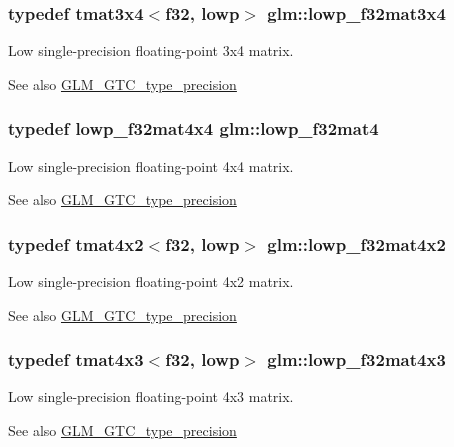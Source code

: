 \subsubsection[{lowp\+\_\+f32mat3x4}]{\setlength{\rightskip}{0pt plus 5cm}typedef tmat3x4$<${\bf f32}, lowp$>$ {\bf glm\+::lowp\+\_\+f32mat3x4}}\label{namespaceglm_a5102fa6a00423f045c058f77d8158bdd}
Low single-\/precision floating-\/point 3x4 matrix. \begin{DoxySeeAlso}{See also}
\hyperlink{group__gtc__type__precision}{G\+L\+M\+\_\+\+G\+T\+C\+\_\+type\+\_\+precision} 
\end{DoxySeeAlso}
\hypertarget{namespaceglm_ada4d11f44b410c1be7b6b1d05ccf692c}{}
\subsubsection[{lowp\+\_\+f32mat4}]{\setlength{\rightskip}{0pt plus 5cm}typedef {\bf lowp\+\_\+f32mat4x4} {\bf glm\+::lowp\+\_\+f32mat4}}\label{namespaceglm_ada4d11f44b410c1be7b6b1d05ccf692c}
Low single-\/precision floating-\/point 4x4 matrix. \begin{DoxySeeAlso}{See also}
\hyperlink{group__gtc__type__precision}{G\+L\+M\+\_\+\+G\+T\+C\+\_\+type\+\_\+precision} 
\end{DoxySeeAlso}
\hypertarget{namespaceglm_aa1fa9f01c5151ed5332a046dc87e4356}{}
\subsubsection[{lowp\+\_\+f32mat4x2}]{\setlength{\rightskip}{0pt plus 5cm}typedef tmat4x2$<${\bf f32}, lowp$>$ {\bf glm\+::lowp\+\_\+f32mat4x2}}\label{namespaceglm_aa1fa9f01c5151ed5332a046dc87e4356}
Low single-\/precision floating-\/point 4x2 matrix. \begin{DoxySeeAlso}{See also}
\hyperlink{group__gtc__type__precision}{G\+L\+M\+\_\+\+G\+T\+C\+\_\+type\+\_\+precision} 
\end{DoxySeeAlso}
\hypertarget{namespaceglm_ac2931d0b3712162304ec7f26ba4db4d4}{}
\subsubsection[{lowp\+\_\+f32mat4x3}]{\setlength{\rightskip}{0pt plus 5cm}typedef tmat4x3$<${\bf f32}, lowp$>$ {\bf glm\+::lowp\+\_\+f32mat4x3}}\label{namespaceglm_ac2931d0b3712162304ec7f26ba4db4d4}
Low single-\/precision floating-\/point 4x3 matrix. \begin{DoxySeeAlso}{See also}
\hyperlink{group__gtc__type__precision}{G\+L\+M\+\_\+\+G\+T\+C\+\_\+type\+\_\+precision} 
\end{DoxySeeAlso}
\hypertarget{namespaceglm_a2cb18a3aae9d4e53dbae4554089cc056}{}
